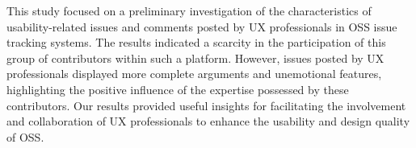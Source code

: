 This study focused on a preliminary investigation of the characteristics of usability-related issues and comments posted by UX professionals in OSS issue tracking systems. The results indicated a scarcity in the participation of this group of contributors within such a platform. However, issues posted by UX professionals displayed more complete arguments and unemotional features, highlighting the positive influence of the expertise possessed by these contributors. Our results provided useful insights for facilitating the involvement and collaboration of UX professionals to enhance the usability and design quality of OSS.